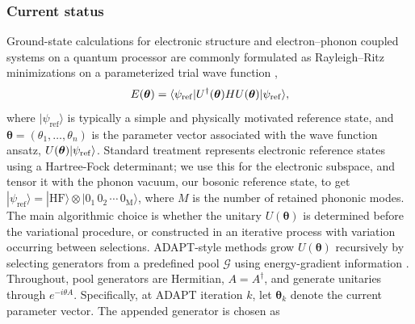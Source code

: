 \documentclass[
  reprint,
  amsmath,
  amssymb,
  aps,
  pra,
  nofootinbib,
  superscriptaddress,
  floatfix
]{revtex4-2}
\newcommand{\ket}[1]{|#1\rangle}
\newcommand{\bra}[1]{\langle #1|}
\begin{document}
\subsubsection{Current status}
Ground-state calculations for electronic structure and electron--phonon coupled systems on a quantum processor are commonly formulated as Rayleigh--Ritz minimizations on a parameterized trial wave function \cite{Peruzzo2014,McClean2016,Kandala2017},
\begin{equation}
E(\boldsymbol{\theta})=
\bra{\psi_{\rm ref}}U^\dagger(\boldsymbol{\theta})HU(\boldsymbol{\theta})\ket{\psi_{\rm ref}},
\label{eq:rayleigh_static}
\end{equation}
where \(\ket{\psi_{\mathrm{ref}}}\) is typically a simple and physically motivated reference state, and $\boldsymbol{\theta}=(\theta_1,\ldots,\theta_n)$ is the parameter vector associated with the wave function ansatz, $U(\boldsymbol{\theta})\ket{\psi_{\rm ref}}$. Standard treatment represents electronic reference states using a Hartree-Fock determinant; we use this for the electronic subspace, and tensor it with the phonon vacuum, our bosonic reference state, to get \(\ket{\psi_{\mathrm{ref}}}=\ket{\mathrm{HF}}\otimes\ket{0_1\,0_2\,\cdots\,0_{\mathrm{M}}}\), where \(M\) is the number of retained phononic modes. The main algorithmic choice is whether the unitary \(U(\boldsymbol{\theta})\) is determined before the variational procedure, or constructed in an iterative process with variation occurring between selections. ADAPT-style methods grow \(U(\boldsymbol{\theta})\) recursively by selecting generators from a predefined pool \(\mathcal{G}\) using energy-gradient information \cite{Grimsley2019,Tang2021,Yordanov2021}. Throughout, pool generators are Hermitian, \(A=A^\dagger\), and generate unitaries through \(e^{-i\theta A}\). Specifically, at ADAPT iteration \(k\), let \(\boldsymbol{\theta}_k\) denote the current parameter vector. The appended generator is chosen as
\end{document}
